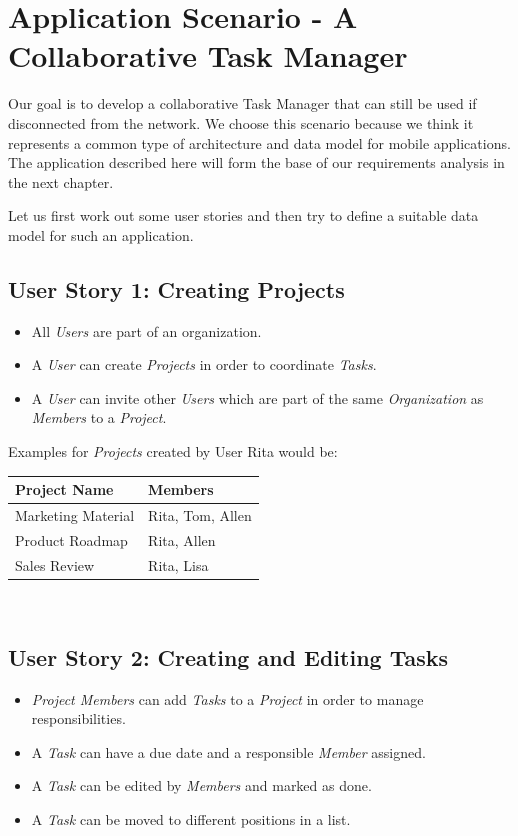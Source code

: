 
\chapter{Application Scenario - A Collaborative Task Manager}
\label{sec:scenario}
Our goal is to develop a collaborative Task Manager that can still be used if disconnected from the network.
We choose this scenario because we think it represents a common type of architecture and data model for mobile applications.
The application described here will form the base of our requirements analysis in the next chapter.

Let us first work out some user stories and then try to define a suitable data model for such an application.

\section{User Story 1: Creating Projects}
\begin{itemize}
\item All \emph{Users} are part of an organization.
\item A \emph{User} can create \emph{Projects} in order to coordinate \emph{Tasks}.
\item A \emph{User} can invite other \emph{Users} which are part of the same \emph{Organization} as \emph{Members} to a \emph{Project}.
\end{itemize}

Examples for \emph{Projects} created by User Rita would be:\\

\begin{tabular}{ l l }
Project Name & Members \\
\hline
Marketing Material & Rita, Tom, Allen \\
Product Roadmap & Rita, Allen \\
Sales Review & Rita, Lisa
\end{tabular}\\

\section{User Story 2: Creating and Editing Tasks}
\begin{itemize}
\item \emph{Project Members} can add \emph{Tasks} to a \emph{Project} in order to manage responsibilities.
\item A \emph{Task} can have a due date and a responsible \emph{Member} assigned.
\item A \emph{Task} can be edited by \emph{Members} and marked as done.
\item A \emph{Task} can be moved to different positions in a list.
\end{itemize}

